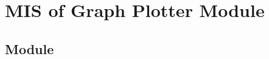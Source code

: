 \documentclass[12pt, titlepage]{article}
\begin{document}
%
%
%
%
%
%
%
%
%
%






\section{MIS of Graph Plotter Module} \label{mBMM} 

\subsection{Module}
\end{document}
